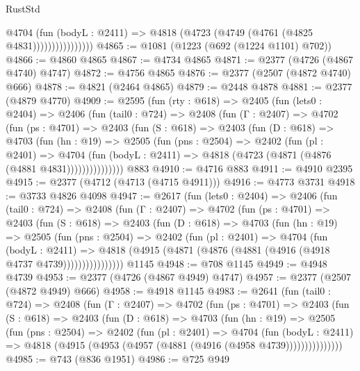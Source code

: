 \begin{lexlean}{RustStd}
\begin{coremodule}
                        @4704
                          (fun (bodyL : @2411) =>
                          @4818 (@4723 (@4749 (@4761 (@4825 @4831))))))))))))))))
@4865 := @1081 (@1223 (@692 (@1224 @1101) @702))
@4866 := @4860 @4865
@4867 := @4734 @4865
@4871 := @2377 (@4726 (@4867 @4740) @4747)
@4872 := @4756 @4865
@4876 := @2377 (@2507 (@4872 @4740) @666)
@4878 := @4821 (@2464 @4865)
@4879 := @2448 @4878
@4881 := @2377 (@4879 @4770)
@4909 := @2595
    (fun (rty : @618) =>
    @2405
      (fun (lets0 : @2404) =>
      @2406
        (fun (tail0 : @724) =>
        @2408
          (fun (Γ : @2407) =>
          @4702
            (fun (ps : @4701) =>
            @2403
              (fun (S : @618) =>
              @2403
                (fun (D : @618) =>
                @4703
                  (fun (hn : @19) =>
                  @2505
                    (fun (pns : @2504) =>
                    @2402
                      (fun (pl : @2401) =>
                      @4704
                        (fun (bodyL : @2411) =>
                        @4818 (@4723 (@4871 (@4876 (@4881 @4831)))))))))))))))
    @883
@4910 := @4716 @883
@4911 := @4910 @2395
@4915 := @2377 (@4712 (@4713 (@4715 @4911)))
@4916 := @4773 @3731
@4918 := @3733 @4826 @4098
@4947 := @2617
    (fun (lets0 : @2404) =>
    @2406
      (fun (tail0 : @724) =>
      @2408
        (fun (Γ : @2407) =>
        @4702
          (fun (ps : @4701) =>
          @2403
            (fun (S : @618) =>
            @2403
              (fun (D : @618) =>
              @4703
                (fun (hn : @19) =>
                @2505
                  (fun (pns : @2504) =>
                  @2402
                    (fun (pl : @2401) =>
                    @4704
                      (fun (bodyL : @2411) =>
                      @4818 (@4915 (@4871 (@4876 (@4881 (@4916 (@4918 @4737 @4739))))))))))))))))
    @1145
@4948 := @708 @1145
@4949 := @4948 @4739
@4953 := @2377 (@4726 (@4867 @4949) @4747)
@4957 := @2377 (@2507 (@4872 @4949) @666)
@4958 := @4918 @1145
@4983 := @2641
    (fun (tail0 : @724) =>
    @2408
      (fun (Γ : @2407) =>
      @4702
        (fun (ps : @4701) =>
        @2403
          (fun (S : @618) =>
          @2403
            (fun (D : @618) =>
            @4703
              (fun (hn : @19) =>
              @2505
                (fun (pns : @2504) =>
                @2402
                  (fun (pl : @2401) =>
                  @4704
                    (fun (bodyL : @2411) =>
                    @4818 (@4915 (@4953 (@4957 (@4881 (@4916 (@4958 @4739)))))))))))))))
@4985 := @743 (@836 @1951)
@4986 := @725 @949

\end{coremodule}
\end{lexlean}
